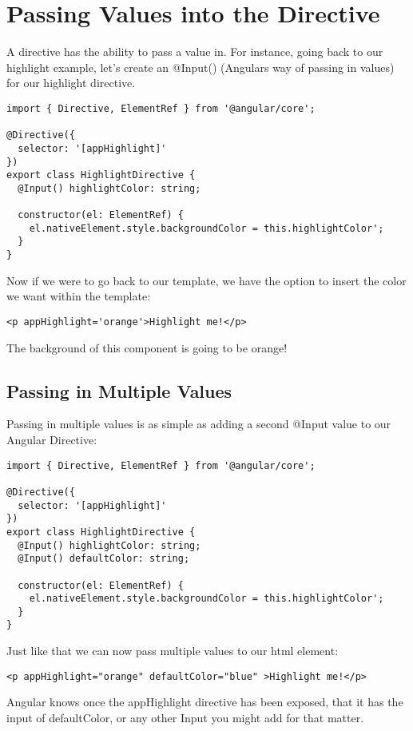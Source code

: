 \section{ Passing Values into the Directive }
A directive has the ability to pass a value in. For instance, going back to our
highlight example, let's create an @Input() (Angulars way of passing in values)
for our highlight directive.
\begin{lstlisting}
import { Directive, ElementRef } from '@angular/core';

@Directive({
  selector: '[appHighlight]'
})
export class HighlightDirective {
  @Input() highlightColor: string;

  constructor(el: ElementRef) {
    el.nativeElement.style.backgroundColor = this.highlightColor';
  }
}
\end{lstlisting}

Now if we were to go back to our template, we have the option to insert the
color we want within the template:
\begin{lstlisting}
<p appHighlight='orange'>Highlight me!</p>
\end{lstlisting}

The background of this component is going to be orange!

\subsection{ Passing in Multiple Values }
Passing in multiple values is as simple as adding a second @Input value to our
Angular Directive:

\begin{lstlisting}
import { Directive, ElementRef } from '@angular/core';

@Directive({
  selector: '[appHighlight]'
})
export class HighlightDirective {
  @Input() highlightColor: string;
  @Input() defaultColor: string;

  constructor(el: ElementRef) {
    el.nativeElement.style.backgroundColor = this.highlightColor';
  }
}
\end{lstlisting}

Just like that we can now pass multiple values to our html element:
\begin{lstlisting}
<p appHighlight="orange" defaultColor="blue" >Highlight me!</p>
\end{lstlisting}

Angular knows once the appHighlight directive has been exposed, that it has the
input of defaultColor, or any other Input you might add for that matter. 


